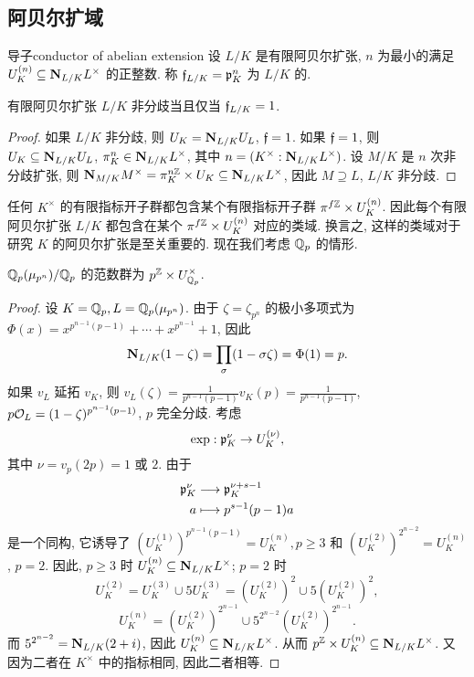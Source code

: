 \subsection{阿贝尔扩域}
\begin{definition}{导子}{conductor of abelian extension}
设 $L/K$ 是有限阿贝尔扩张, $n$ 为最小的满足 $U_K^{(n)}\subseteq {\mathbf{N}}_{L/K}L^\times$ 的正整数. 称 ${\mathfrak{f}}_{L/K}={\mathfrak{p}}_K^n$ 为 $L/K$ 的.
\end{definition}

\begin{proposition}{}{}
有限阿贝尔扩张 $L/K$ 非分歧当且仅当 ${\mathfrak{f}}_{L/K}=1$.
\end{proposition}
\begin{proof}
如果 $L/K$ 非分歧, 则 $U_K={\mathbf{N}}_{L/K}U_L$, ${\mathfrak{f}}=1$. 如果 ${\mathfrak{f}}=1$, 则 $U_K\subseteq {\mathbf{N}}_{L/K}U_L$, $\pi_K^n\in {\mathbf{N}}_{L/K}L^\times$, 其中 $n=(K^\times:{\mathbf{N}}_{L/K}L^\times)$.
设 $M/K$ 是 $n$ 次非分歧扩张, 则 ${\mathbf{N}}_{M/K}M^\times=\pi_K^{n{\mathbb{Z}}}\times U_K\subseteq{\mathbf{N}}_{L/K}L^\times$, 因此 $M\supseteq L$, $L/K$ 非分歧.
\end{proof}

任何 $K^\times$ 的有限指标开子群都包含某个有限指标开子群 $\pi^{f{\mathbb{Z}}}\times U_K^{(n)}$. 因此每个有限阿贝尔扩张 $L/K$ 都包含在某个 $\pi^{f{\mathbb{Z}}}\times U_K^{(n)}$ 对应的类域. 换言之, 这样的类域对于研究 $K$ 的阿贝尔扩张是至关重要的. 现在我们考虑 ${\mathbb{Q}}_p$ 的情形.

\begin{proposition}{}{}
${\mathbb{Q}}_p(\mu_{p^n})/{\mathbb{Q}}_p$ 的范数群为 $p^{\mathbb{Z}}\times U_{{\mathbb{Q}}_p}^\times$.
\end{proposition}
\begin{proof}
设 $K={\mathbb{Q}}_p, L={\mathbb{Q}}_p(\mu_{p^n})$. 由于 $\zeta=\zeta_{p^n}$ 的极小多项式为 $\Phi(x)=x^{p^{n-1}(p-1)}+\cdots+x^{p^{n-1}}+1$, 因此
  \[{\mathbf{N}}_{L/K}(1-\zeta)=\prod_\sigma (1-\sigma\zeta)=\Phi(1)=p.\]
如果 $v_L$ 延拓 $v_K$, 则 $v_L(\zeta)=\frac{1}{p^{n-1}(p-1)} v_K(p)=\frac{1}{p^{n-1}(p-1)}$, $p{\mathcal{O}}_L=(1-\zeta)^{p^{n-1}(p-1)}$, $p$ 完全分歧. 考虑
  \[\exp:{\mathfrak{p}}_K^\nu\to U_K^{(\nu)},\]
其中 $\nu=v_p(2p)=1$ 或 $2$. 由于 
  \[\begin{split}{\mathfrak{p}}_K^\nu &\longrightarrow {\mathfrak{p}}_K^{\nu+s-1} \\ a &\longmapsto p^{s-1}(p-1)a\end{split}\]
是一个同构, 它诱导了 $(U_K^{(1)})^{p^{n-1}(p-1)}=U_K^{(n)},p\ge 3$ 和 $(U_K^{(2)})^{2^{n-2}}=U_K^{(n)}$, $p=2$. 因此, $p\ge3$ 时 $U_K^{(n)}\subseteq {\mathbf{N}}_{L/K}L^\times$; $p=2$ 时
  \[U_K^{(2)}=U_K^{(3)}\cup 5U_K^{(3)}=(U_K^{(2)})^2\cup 5(U_K^{(2)})^2,\]
  \[U_K^{(n)}=(U_K^{(2)})^{2^{n-1}}\cup 5^{2^{n-2}}(U_K^{(2)})^{2^{n-1}}.\]
而 $5^{2^{n-2}}={\mathbf{N}}_{L/K}(2+i)$, 因此 $U_K^{(n)}\subseteq {\mathbf{N}}_{L/K}L^\times$. 从而 $p^{\mathbb{Z}}\times U_K^{(n)}\subseteq {\mathbf{N}}_{L/K}L^\times$. 又因为二者在 $K^\times$ 中的指标相同, 因此二者相等.
\end{proof}

